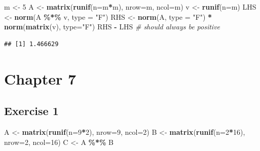 \documentclass[
]{book}
\newenvironment{Shaded}{\begin{snugshade}}{\end{snugshade}}
\newcommand{\CommentTok}[1]{\textcolor[rgb]{0.56,0.35,0.01}{\textit{#1}}}
\newcommand{\DataTypeTok}[1]{\textcolor[rgb]{0.13,0.29,0.53}{#1}}
\newcommand{\DecValTok}[1]{\textcolor[rgb]{0.00,0.00,0.81}{#1}}
\newcommand{\KeywordTok}[1]{\textcolor[rgb]{0.13,0.29,0.53}{\textbf{#1}}}
\newcommand{\NormalTok}[1]{#1}
\newcommand{\OperatorTok}[1]{\textcolor[rgb]{0.81,0.36,0.00}{\textbf{#1}}}
\newcommand{\StringTok}[1]{\textcolor[rgb]{0.31,0.60,0.02}{#1}}
\begin{document}
\begin{Shaded}
\begin{Highlighting}[]
\NormalTok{m \textless{}{-}}\StringTok{ }\DecValTok{5}
\NormalTok{A \textless{}{-}}\StringTok{ }\KeywordTok{matrix}\NormalTok{(}\KeywordTok{runif}\NormalTok{(}\DataTypeTok{n=}\NormalTok{m}\OperatorTok{*}\NormalTok{m), }\DataTypeTok{nrow=}\NormalTok{m, }\DataTypeTok{ncol=}\NormalTok{m)}
\NormalTok{v \textless{}{-}}\StringTok{ }\KeywordTok{runif}\NormalTok{(}\DataTypeTok{n=}\NormalTok{m)}
\NormalTok{LHS \textless{}{-}}\StringTok{ }\KeywordTok{norm}\NormalTok{(A }\OperatorTok{\%*\%}\StringTok{ }\NormalTok{v, }\DataTypeTok{type =} \StringTok{"F"}\NormalTok{)}
\NormalTok{RHS \textless{}{-}}\StringTok{ }\KeywordTok{norm}\NormalTok{(A, }\DataTypeTok{type =} \StringTok{"F"}\NormalTok{) }\OperatorTok{*}\StringTok{ }\KeywordTok{norm}\NormalTok{(}\KeywordTok{matrix}\NormalTok{(v), }\DataTypeTok{type=}\StringTok{"F"}\NormalTok{)}
\NormalTok{RHS }\OperatorTok{{-}}\StringTok{ }\NormalTok{LHS }\CommentTok{\# should always be positive}
\end{Highlighting}
\end{Shaded}

\begin{verbatim}
## [1] 1.466629
\end{verbatim}

\hypertarget{chapter-7-1}{%
\section*{Chapter 7}\label{chapter-7-1}}

\hypertarget{exercise-1-3}{%
\subsection*{Exercise 1}\label{exercise-1-3}}

\begin{Shaded}
\begin{Highlighting}[]
\NormalTok{A \textless{}{-}}\StringTok{ }\KeywordTok{matrix}\NormalTok{(}\KeywordTok{runif}\NormalTok{(}\DataTypeTok{n=}\DecValTok{9}\OperatorTok{*}\DecValTok{2}\NormalTok{), }\DataTypeTok{nrow=}\DecValTok{9}\NormalTok{, }\DataTypeTok{ncol=}\DecValTok{2}\NormalTok{)}
\NormalTok{B \textless{}{-}}\StringTok{ }\KeywordTok{matrix}\NormalTok{(}\KeywordTok{runif}\NormalTok{(}\DataTypeTok{n=}\DecValTok{2}\OperatorTok{*}\DecValTok{16}\NormalTok{), }\DataTypeTok{nrow=}\DecValTok{2}\NormalTok{, }\DataTypeTok{ncol=}\DecValTok{16}\NormalTok{)}
\NormalTok{C \textless{}{-}}\StringTok{ }\NormalTok{A }\OperatorTok{\%*\%}\StringTok{ }\NormalTok{B}
\end{Highlighting}
\end{Shaded}
\end{document}
